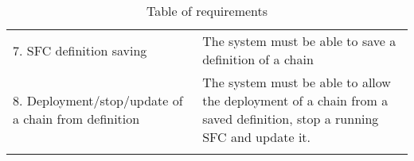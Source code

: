 \begin{longtable}[c]{p{}p{}}
7. SFC definition saving                                                & The system must be able to save a definition of a chain                                                                                                                                        \\
8. Deployment/stop/update of a chain from definition                    & The system must be able to allow the deployment of a chain from a saved definition, stop a running SFC and update it.                                                                          \\ \hline
\caption{Table of requirements}
\label{chap:prjan:tab:req}\\
\end{longtable}